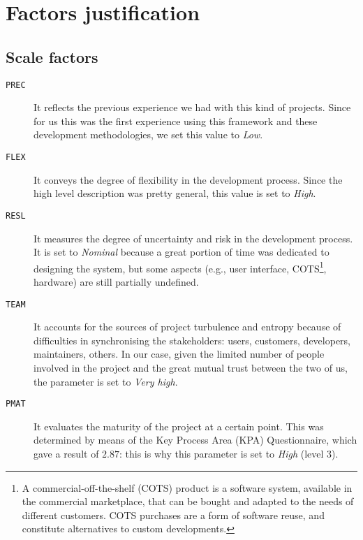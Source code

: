 \chapter{Factors justification}\label{chap:justification}

\section{Scale factors}

\begin{description}
	
	
	\item [\normalfont\texttt{PREC}] It reflects the previous experience we had with this kind of projects. Since for us this was the first experience using this framework and these development methodologies, we set this value to \emph{Low}.
	
	\item [\normalfont\texttt{FLEX}] It conveys the degree of flexibility in the development process. Since the high level description was pretty general, this value is set to \emph{High}.
	
	\item [\normalfont\texttt{RESL}] It measures the degree of uncertainty and risk in the development process. It is set to \emph{Nominal} because a great portion of time was dedicated to designing the system, but some aspects (e.g., user interface, COTS\footnote{A commercial-off-the-shelf (COTS) product is a software system, available in the commercial marketplace, that can be bought and adapted to the needs of different customers. COTS purchases are a form of software reuse, and constitute alternatives to custom developments.}, hardware) are still partially undefined.
	
	\item [\normalfont\texttt{TEAM}] It accounts for the sources of project turbulence and entropy because of difficulties in synchronising the stakeholders: users, customers, developers, maintainers, others. In our case, given the limited number of people involved in the project and the great mutual trust between the two of us, the parameter is set to \emph{Very high}.
	
	\item [\normalfont\texttt{PMAT}] It evaluates the maturity of the project at a certain point. This was determined by means of the Key Process Area (KPA) Questionnaire, which gave a result of $ 2.87 $: this is why this parameter is set to \emph{High} (level 3).

\end{description}



















